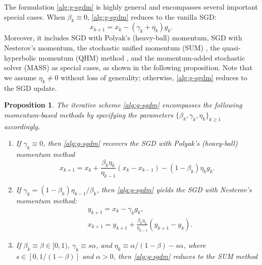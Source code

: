 \documentclass[10pt]{article}
\numberwithin{equation}{section}
\newtheorem{proposition}{Proposition}
\theoremstyle{definition}
\begin{document}
The formulation \eqref{alg:g-sgdm} is highly general and encompasses several important special cases. When $\beta_k\equiv 0$, \eqref{alg:g-sgdm} reduces to the vanilla SGD:
\begin{equation}\label{alg:sgd}
\tag{SGD}
    x_{k+1}=x_k-(\gamma_k+\eta_k) g_k.
\end{equation}
%
Moreover, it includes SGD with Polyak’s (heavy-ball) momentum, SGD with Nesterov's momentum, the stochastic unified momentum (SUM) \citep{yan2018unified}, the quasi-hyperbolic momentum (QHM) method \citep{ma2018quasi}, and the momentum-added stochastic solver (MASS) \citep{liu2018accelerating} as special cases, as shown in the following proposition. Note that we assume $\eta_k\neq 0$ without loss of generality; otherwise, \eqref{alg:g-sgdm} reduces to the SGD update.
\begin{proposition}\label{prop:hb&nes&sum}
   The iterative scheme \eqref{alg:g-sgdm} encompasses the following momentum-based methods by specifying the parameters $\{\beta_k,\gamma_k,\eta_k\}_{k\ge 1}$ accordingly.
   \begin{enumerate}
    \item[(\romannumeral1).] If $\gamma_k\equiv0$, then \eqref{alg:g-sgdm} recovers the SGD with Polyak's (heavy-ball) momentum method
       \begin{equation}\label{alg:sgd-hb}
        \tag{SGD-HB}
        x_{k+1}=x_k + \frac{\beta_k \eta_k}{\eta_{k-1}} (x_k - x_{k-1}) - (1-\beta_k)\eta_k g_k.
        \end{equation}
    \item[(\romannumeral2).] If $\gamma_k=(1-\beta_k)\eta_{k-1}/\beta_k$, then \eqref{alg:g-sgdm} yields the SGD with Nesterov's momentum method:
        \begin{equation}\label{alg:sgd-nesterov}
        \tag{SGD-N}
            \begin{aligned}
                &y_{k+1} =x_k-\gamma_k g_k, \\
                &x_{k+1} =y_{k+1}+\frac{\beta_k\eta_k}{\eta_{k-1}}(y_{k+1}-y_k).
            \end{aligned}
        \end{equation}
    \item[(\romannumeral3).] If $\beta_k\equiv\beta\in[0,1)$, $\gamma_k\equiv s\alpha$, and $\eta_k\equiv \alpha/(1-\beta)-s\alpha$, where $s\in[0,1/(1-\beta)]$ and $\alpha>0$, then \eqref{alg:g-sgdm} reduces to the SUM method
        \begin{equation}\label{alg:sum}
        \tag{SUM}

\end{equation}
\end{enumerate}
\end{proposition}
\end{document}
